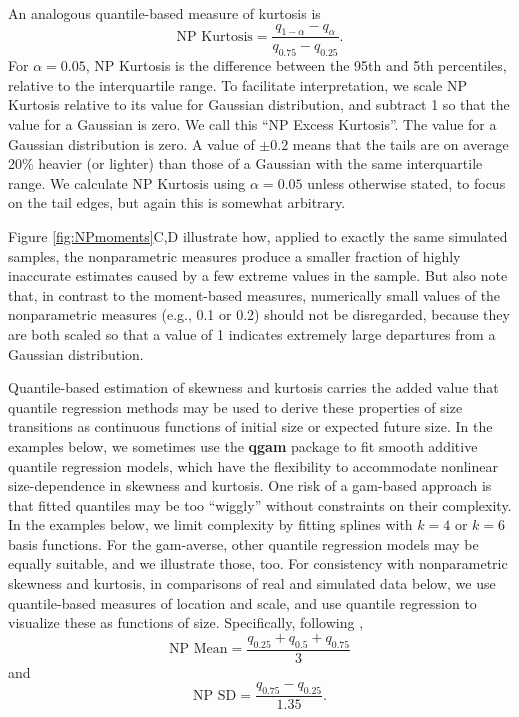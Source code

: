 \documentclass[12pt]{article}
\newcounter{box}
\newcommand{\be}{\begin{equation}}
\newcommand{\ee}{\end{equation}}
\begin{document}
An analogous quantile-based measure of kurtosis \citep{jones-etal-1994} is 
\be
\mbox{NP Kurtosis}  = \frac{q_{1-\alpha} - q_{\alpha}}{q_{0.75} - q_{0.25}}.
\label{eqn:NPkurt}
\ee
For $\alpha=0.05$, NP Kurtosis is the difference between the 95th and 5th percentiles, relative to the interquartile range. 
To facilitate interpretation, we scale NP Kurtosis relative to its value for Gaussian distribution, and subtract 1 so that the value for a Gaussian is zero. 
We call this ``NP Excess Kurtosis''. 
The value for a Gaussian distribution is zero. 
A value of $\pm 0.2$ means that the tails are on average 20\% heavier (or lighter) than those of a Gaussian with the same interquartile range. 
We calculate NP Kurtosis using $\alpha=0.05$ unless otherwise stated, to focus on the tail edges, but again this is somewhat arbitrary. 

Figure \ref{fig:NPmoments}C,D illustrate how, applied to exactly the same simulated samples, the nonparametric measures produce a smaller fraction of highly inaccurate estimates caused by a few extreme values in the sample. 
But also note that, in contrast to the moment-based measures, numerically small values of the nonparametric measures (e.g., 0.1 or 0.2) should not be disregarded, because they are both scaled so that a value of 1 indicates extremely large departures from a Gaussian distribution. 

Quantile-based estimation of skewness and kurtosis carries the added value that quantile regression methods may be used to derive these properties of size transitions as continuous functions of initial size or expected future size. 
In the examples below, we sometimes use the \textbf{qgam} package to fit smooth additive quantile regression models, which have the flexibility to accommodate nonlinear size-dependence in skewness and kurtosis. 
One risk of a gam-based approach is that fitted quantiles may be too ``wiggly'' without constraints on their complexity. In the examples below, we limit complexity by fitting splines with $k=4$ or $k=6$ basis functions. 
For the gam-averse, other quantile regression models may be equally suitable, and we illustrate those, too. 
For consistency with nonparametric skewness and kurtosis, in comparisons of real and simulated data below, we use quantile-based measures of location and scale, and use quantile regression to visualize these as functions of size. 
Specifically, following \cite{wan2014estimating},
\be
\mbox{NP Mean}  = \frac{q_{0.25} + q_{0.5} + q_{0.75}}{3}
\label{eqn:NPmean}
\ee
and
\be
\mbox{NP SD}  = \frac{q_{0.75} - q_{0.25}}{1.35}.
\label{eqn:NPsd}
\ee
\end{document}

